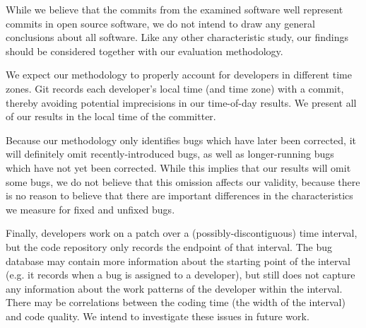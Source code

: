While we believe that the commits from the examined software well
represent commits in open source software, we do not intend to draw
any general conclusions about all software.  Like any other
characteristic study, our findings should be considered together with
our evaluation methodology.

We expect our methodology to properly account for developers in
different time zones. Git records each developer's local time (and
time zone) with a commit, thereby avoiding potential imprecisions in
our time-of-day results. We present all of our results in the local
time of the committer.

Because our methodology only identifies bugs which have later been
corrected, it will definitely omit recently-introduced bugs, as well
as longer-running bugs which have not yet been corrected. While this
implies that our results will omit some bugs, we do not believe that
this omission affects our validity, because there is no reason to
believe that there are important differences in the characteristics we
measure for fixed and unfixed bugs.

Finally, developers work on a patch over a (possibly-discontiguous)
time interval, but the code repository only records the endpoint of
that interval. The bug database may contain more information about the
starting point of the interval (e.g. it records when a bug is assigned
to a developer), but still does not capture any information about the
work patterns of the developer within the interval. There may be
correlations between the coding time (the width of the interval) and
code quality. We intend to investigate these issues in future work.

